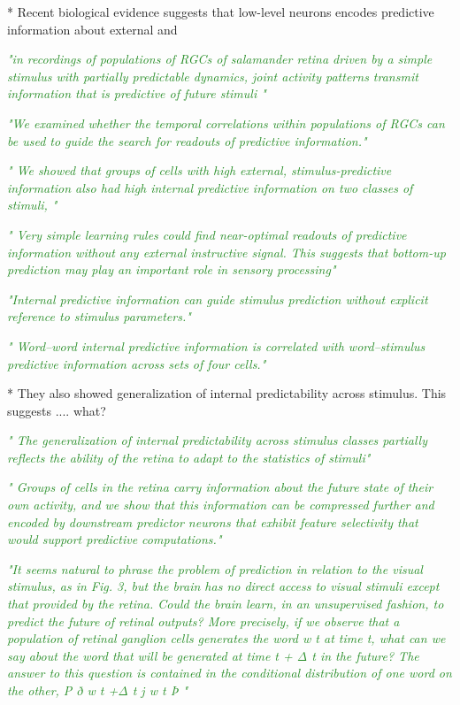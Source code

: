 \documentclass[utf8]{article}
\newcommand{\rewrite}[1]{\textcolor{ForestGreen}{\textit{"#1"}}}
\begin{document}
		* Recent biological evidence suggests that low-level neurons encodes predictive information about external  and 
		
		\cite{sederberg2018learning}
		\rewrite{in recordings of populations of RGCs of salamander retina driven by a simple stimulus with partially predictable dynamics, joint activity patterns transmit information that is predictive of future stimuli }
		
		\rewrite{We examined whether the temporal correlations within populations of RGCs can be used to guide the search for readouts of predictive information.}
		
		\rewrite{ We showed that groups of cells with high external, stimulus-predictive information also had high internal predictive information on two classes of stimuli, }
		
		\rewrite{
			Very simple learning rules could find near-optimal readouts of predictive information without any external instructive signal. This suggests that bottom-up prediction may play an important role in sensory processing}
		
		\rewrite{Internal predictive information can guide stimulus prediction without explicit reference to stimulus parameters.}
		
		\rewrite{ Word–word internal predictive information is correlated with word–stimulus predictive information across sets of four cells.}
		
		* They also showed generalization of internal predictability across stimulus. This suggests .... what?
		
		\rewrite{ The generalization of internal predictability across stimulus classes partially reflects the ability of the retina to adapt to the statistics of stimuli}
		
		
		\cite{Palmer2015}
		\rewrite{ Groups of cells in the retina carry information about the future state of their own activity, and we show that this information can be compressed further and encoded by downstream predictor neurons that exhibit feature selectivity that would support predictive computations.}
		
		
		\rewrite{It seems natural to phrase the problem of prediction in relation to the visual stimulus, as in Fig. 3, but the brain has no direct access to visual stimuli except that provided by the retina. Could the brain learn, in an unsupervised fashion, to predict the future of retinal outputs? More precisely, if we observe that a population of retinal ganglion cells generates the word w t at time t, what can we say about the word that will be generated at time t + Δ t in the future? The answer to this question is contained in the conditional distribution of one word on the other, P ð w t +Δ t j w t Þ }
		
\end{document}
